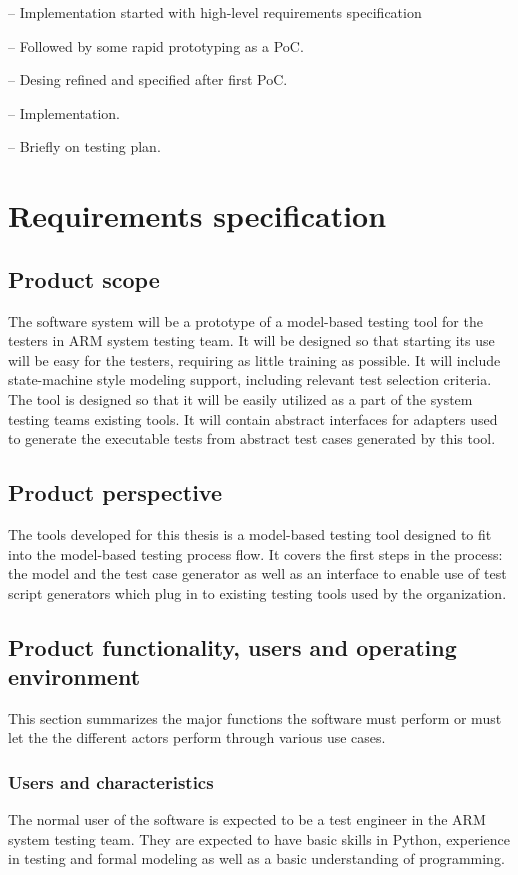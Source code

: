 
-- Implementation started with high-level requirements specification

-- Followed by some rapid prototyping as a PoC.

-- Desing refined and specified after first PoC.

-- Implementation.

-- Briefly on testing plan.


\section{Requirements specification}

\subsection{Product scope}
The software system will be a prototype of a model-based testing tool for the testers in ARM system testing team. It will be designed so that starting its use will be easy for the testers, requiring as little training as possible. It will include state-machine style modeling support, including relevant test selection criteria. 
The tool is designed so that it will be easily utilized as a part of the system testing teams existing tools. It will contain abstract interfaces for adapters used to generate the executable tests from abstract test cases generated by this tool. 

\subsection{Product perspective}
The tools developed for this thesis is a model-based testing tool designed to fit into the model-based testing process flow. It covers the first steps in the process: the model and the test case generator as well as an interface to enable use of test script generators which plug in to existing testing tools used by the organization.

\subsection{Product functionality, users and operating environment}
This section summarizes the major functions the software must perform or must let the the different actors perform through various use cases.

\subsubsection{Users and characteristics}
The normal user of the software is expected to be a test engineer in the ARM system testing team. They are expected to have basic skills in Python, experience in testing and formal modeling as well as a basic understanding of programming. 

